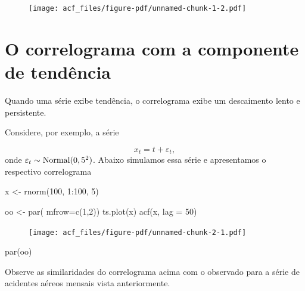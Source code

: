 \documentclass[
  letterpaper,
  DIV=11,
  numbers=noendperiod]{scrreprt}
\newenvironment{Shaded}{\begin{snugshade}}{\end{snugshade}}
\newcommand{\AttributeTok}[1]{\textcolor[rgb]{0.40,0.45,0.13}{#1}}
\newcommand{\DecValTok}[1]{\textcolor[rgb]{0.68,0.00,0.00}{#1}}
\newcommand{\FunctionTok}[1]{\textcolor[rgb]{0.28,0.35,0.67}{#1}}
\newcommand{\NormalTok}[1]{\textcolor[rgb]{0.00,0.23,0.31}{#1}}
\newcommand{\OtherTok}[1]{\textcolor[rgb]{0.00,0.23,0.31}{#1}}
\newcommand{\SpecialCharTok}[1]{\textcolor[rgb]{0.37,0.37,0.37}{#1}}
\begin{document}
\begin{figure}[H]

{\centering \texttt{[image: acf\_files/figure-pdf/unnamed-chunk-1-2.pdf]}

}

\end{figure}

\hypertarget{o-correlograma-com-a-componente-de-tenduxeancia}{%
\section{O correlograma com a componente de
tendência}\label{o-correlograma-com-a-componente-de-tenduxeancia}}

Quando uma série exibe tendência, o correlograma exibe um descaimento
lento e persistente.

Considere, por exemplo, a série

\[x_t= t + \varepsilon_t,\] onde
\(\varepsilon_t\sim\hbox{Normal}(0,5^2)\). Abaixo simulamos essa série e
apresentamos o respectivo correlograma

\begin{Shaded}
\begin{Highlighting}[]
\NormalTok{x }\OtherTok{\textless{}{-}} \FunctionTok{rnorm}\NormalTok{(}\DecValTok{100}\NormalTok{, }\DecValTok{1}\SpecialCharTok{:}\DecValTok{100}\NormalTok{, }\DecValTok{5}\NormalTok{)}

\NormalTok{oo }\OtherTok{\textless{}{-}} \FunctionTok{par}\NormalTok{( }\AttributeTok{mfrow=}\FunctionTok{c}\NormalTok{(}\DecValTok{1}\NormalTok{,}\DecValTok{2}\NormalTok{))}
\FunctionTok{ts.plot}\NormalTok{(x)}
\FunctionTok{acf}\NormalTok{(x, }\AttributeTok{lag =} \DecValTok{50}\NormalTok{)}
\end{Highlighting}
\end{Shaded}

\begin{figure}[H]

{\centering \texttt{[image: acf\_files/figure-pdf/unnamed-chunk-2-1.pdf]}

}

\end{figure}

\begin{Shaded}
\begin{Highlighting}[]
\FunctionTok{par}\NormalTok{(oo)}
\end{Highlighting}
\end{Shaded}

Observe as similaridades do correlograma acima com o observado para a
série de acidentes aéreos mensais vista anteriormente.
\end{document}
